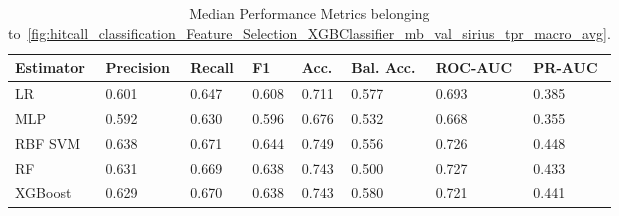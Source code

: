 \begin{longtable}{llllllll}
\caption{Median Performance Metrics belonging to~\ref{fig:hitcall_classification_Feature_Selection_XGBClassifier_mb_val_sirius_tpr_macro_avg}.}\label{tab:table:hitcall_classification_feature_selection_xgbclassifier_mb_val_sirius_tpr_macro_avg}\\
\toprule
\midrule
\small Estimator & \small Precision & \small Recall & \small F1 & \small Acc. & \small Bal. Acc. & \small ROC-AUC & \small PR-AUC\\
\hline
LR & 0.601 & 0.647 & 0.608 & 0.711 & 0.577 & 0.693 & 0.385\\
MLP & 0.592 & 0.630 & 0.596 & 0.676 & 0.532 & 0.668 & 0.355\\
RBF SVM & 0.638 & 0.671 & 0.644 & 0.749 & 0.556 & 0.726 & 0.448\\
RF & 0.631 & 0.669 & 0.638 & 0.743 & 0.500 & 0.727 & 0.433\\
XGBoost & 0.629 & 0.670 & 0.638 & 0.743 & 0.580 & 0.721 & 0.441\\
\bottomrule
\end{longtable}